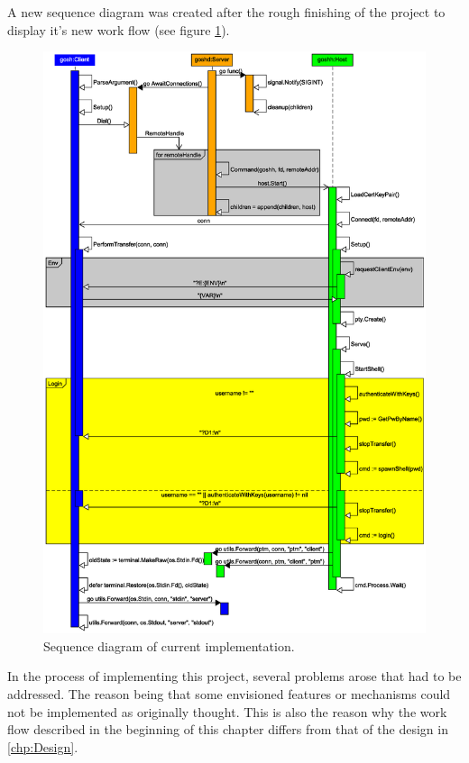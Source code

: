 \documentclass[10pt,a4paper,titlepage,twoside,english,final]{zhawreprt}
\begin{document}
A new sequence diagram was created after the rough finishing of the project to display it's new work flow (see figure \ref{fig:SeqDiaCurrent}).

\begin{figure}[ht]
\includegraphics[width=\textwidth]{SequenceDiagramNew}
\caption{Sequence diagram of current implementation.}
\label{fig:SeqDiaCurrent}
\end{figure}

In the process of implementing this project, several problems arose that had to be addressed.
The reason being that some envisioned features or mechanisms could not be implemented as originally thought.
This is also the reason why the work flow described in the beginning of this chapter differs from that of the design in \ref{chp:Design}.
\end{document}
